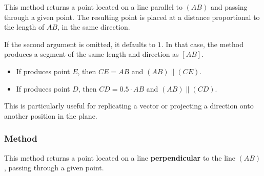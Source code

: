 This method returns a point located on a line parallel to $(AB)$ and passing through a given point. The resulting point is placed at a distance proportional to the length of $AB$, in the same direction.

\medskip
\noindent
If the second argument  is omitted, it defaults to $1$. In that case, the method produces a segment of the same length and direction as $[AB]$.

\medskip
\noindent
{}
\begin{itemize}
  \item If  produces point $E$, then $CE = AB$ and $(AB) \parallel (CE)$.
  \item If  produces point $D$, then $CD = 0.5 \cdot AB$ and $(AB) \parallel (CD)$.
\end{itemize}

\noindent
This is particularly useful for replicating a vector or projecting a direction onto another position in the plane.

\vspace{1em}
\begin{minipage}{.5\textwidth}
\begin{center}
\end{center}
\end{minipage}
\begin{minipage}{.5\textwidth}
\begin{tkzexample}
\end{tkzexample}
\end{minipage}

\subsubsection{Method } %
\label{ssub:method_line_orthogonal__at}
This method returns a point located on a line \textbf{perpendicular} to the line $(AB)$, passing through a given point.

